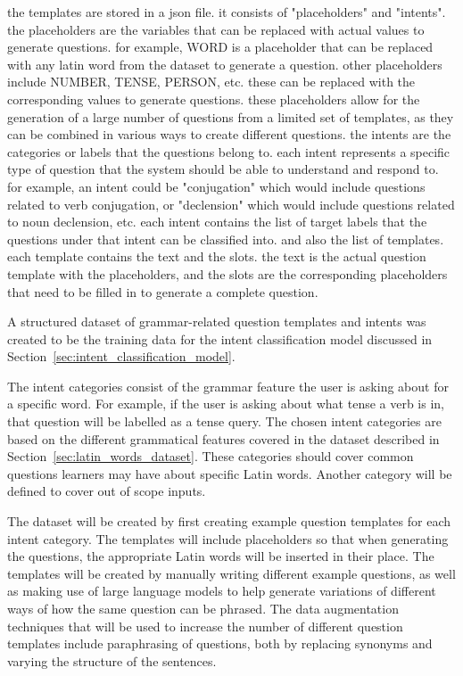 the templates are stored in a json file.
it consists of "placeholders" and "intents".
the placeholders are the variables that can be replaced with actual values to generate questions.
for example, WORD is a placeholder that can be replaced with any latin word from the dataset to generate a question.
other placeholders include NUMBER, TENSE, PERSON, etc.
these can be replaced with the corresponding values to generate questions.
these placeholders allow for the generation of a large number of questions from a limited set of templates, as they can be combined in various ways to create different questions.
the intents are the categories or labels that the questions belong to.
each intent represents a specific type of question that the system should be able to understand and respond to.
for example, an intent could be "conjugation" which would include questions related to verb conjugation, or "declension" which would include questions related to noun declension, etc.
each intent contains the list of target labels that the questions under that intent can be classified into.
and also the list of templates.
each template contains the text and the slots.
the text is the actual question template with the placeholders, and the slots are the corresponding placeholders that need to be filled in to generate a complete question.


A structured dataset of grammar-related question templates 
and intents was created to be the training data for the 
intent classification model discussed in Section~\ref{sec:intent_classification_model}. 

The intent categories consist of the grammar feature 
the user is asking about for a specific word. For example, 
if the user is asking about what tense a verb is in, that 
question will be labelled as a tense query. The chosen intent 
categories are based on the different grammatical features 
covered in the dataset described in Section~\ref{sec:latin_words_dataset}. 
These categories should cover common questions learners may 
have about specific Latin words. Another category will be 
defined to cover out of scope inputs.

The dataset will be created by first creating example question 
templates for each intent category. The templates will include 
placeholders so that when generating the questions, the 
appropriate Latin words will be inserted in their place. 
The templates will be created by manually writing different 
example questions, as well as making use of large language 
models to help generate variations of different ways of how 
the same question can be phrased. The data augmentation 
techniques that will be used to increase the number of 
different question templates include paraphrasing of questions, 
both by replacing synonyms and varying the structure of the 
sentences. 

